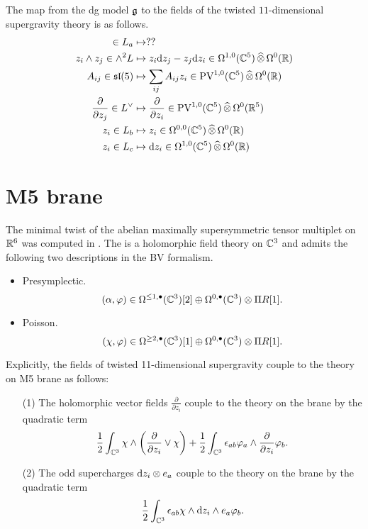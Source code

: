 \documentclass[11pt]{amsart}
\begin{document}
The map from the dg model $\mathfrak g$ to the fields of the twisted $11$-dimensional supergravity theory is as follows. 
\begin{align*}
 \in L_a & \mapsto ?? \\
z_i \wedge z_j \in \wedge^2 L & \mapsto z_i {\rm d} z_j - z_j {\rm d} z_i \in \Omega^{1,0} (\mathbb C^5) \, \widehat{\otimes} \, \Omega^0 (\mathbb R) \\
A_{ij} \in \mathfrak{sl}(5) & \mapsto \sum_{ij} A_{ij} z_i \in {\rm PV}^{1,0}(\mathbb C^5) \, \widehat{\otimes} \, \Omega^0(\mathbb R) \\\frac{\partial}{\partial z_j} \in L^\vee & \mapsto
\frac{\partial}{\partial z_i} \in {\rm PV}^{1,0} (\mathbb C^5) \, \widehat{\otimes} \, \Omega^0 (\mathbb R^5) \\ z_i \in L_b & \mapsto z_i \in \Omega^{0,0}(\mathbb C^5) \, \widehat{\otimes} \, \Omega^0 (\mathbb R) \\
z_i \in L_c & \mapsto {\rm d} z_i \in \Omega^{1,0}(\mathbb C^5) \, \widehat{\otimes} \, \Omega^0 (\mathbb R)
\end{align*}

\section{M5 brane}

The minimal twist of the abelian maximally supersymmetric tensor multiplet on $\mathbb R^6$ was computed in \cite{SWpre}. 
The is a holomorphic field theory on $\mathbb C^3$ and admits the following two descriptions in the BV formalism.

\begin{itemize}
\item Presymplectic. 
\[
(\alpha, \varphi) \in \Omega^{\leq 1, \bullet}(\mathbb C^3)[2] \oplus \Omega^{0,\bullet}(\mathbb C^3) \otimes \Pi R [1] .
\]
\item Poisson.
\[
(\chi, \varphi) \in \Omega^{\geq 2, \bullet}(\mathbb C^3)[1] \oplus \Omega^{0,\bullet}(\mathbb C^3) \otimes \Pi R [1].
\]
\end{itemize}

Explicitly, the fields of twisted 11-dimensional supergravity couple to the theory on M5 brane as follows:
\begin{itemize}
\item[(1)] The holomorphic vector fields $\frac{\partial}{\partial z_i}$ couple to the theory on the brane by the quadratic term
\[
\frac12 \int_{\mathbb C^3} \chi \wedge \left(\frac{\partial}{\partial z_i} \vee \chi\right) + \frac12 \int_{\mathbb C^3} \epsilon_{ab} \varphi_a \wedge \frac{\partial}{\partial z_i} \varphi_b .
\]
\item[(2)] The odd supercharges ${\rm d} z_i \otimes e_a$ couple to the theory on the brane by the quadratic term 
\[
\frac12 \int_{\mathbb C^3} \epsilon_{ab} \chi \wedge {\rm d} z_i \wedge e_a \varphi_b .
\]
\end{itemize}
\end{document}
